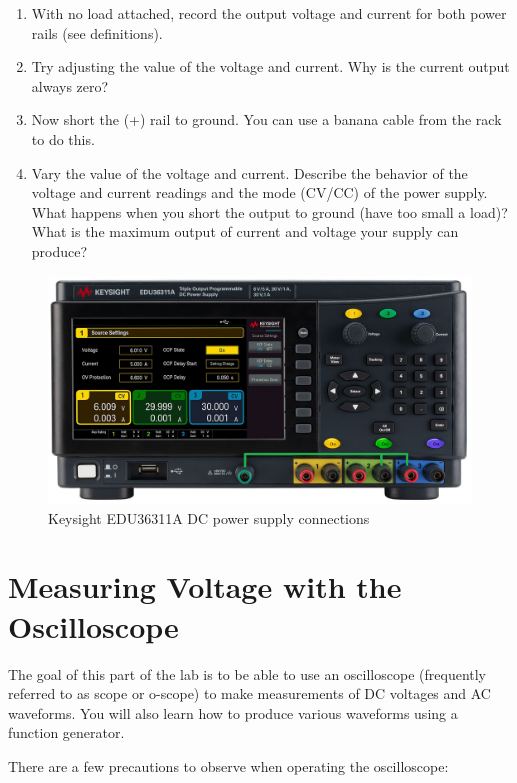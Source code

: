 \documentclass[10pt]{PhysLab1C} %
\begin{document}
\begin{enumerate}
\item
  With no load attached, record the output voltage and current for both
  power rails (see definitions).
\item
  Try adjusting the value of the voltage and current. Why is the current
  output always zero?
\item
  Now short the (+) rail to ground. You can use a banana cable from the
  rack to do this.
\item
  Vary the value of the voltage and current. Describe the behavior of
  the voltage and current readings and the mode (CV/CC) of the power
  supply. What happens when you short the output to ground (have too
  small a load)? What is the maximum output of current and voltage your
  supply can produce?
\end{enumerate}

\begin{figure}\centering
    \includegraphics[width=\linewidth]{lab1fig/EDU36311A.png}
    \caption{Keysight EDU36311A DC power supply connections}
    \label{fig:ps}
\end{figure}


\section{Measuring Voltage with the Oscilloscope}

The goal of this part of the lab is to be able to use an oscilloscope
(frequently referred to as scope or o-scope) to make measurements of DC
voltages and AC waveforms. You will also learn how to produce various
waveforms using a function generator.

There are a few precautions to observe when operating the oscilloscope:
\end{document}
